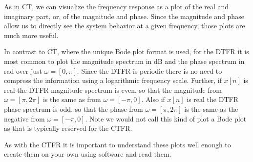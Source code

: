 As in CT, we can visualize the frequency response as a plot of the real and imaginary part, or, of the magnitude and phase. Since the magnitude and phase allow us to directly see the system behavior at a given frequency, those plots are much more useful.

In contrast to CT, where the unique Bode plot format is used, for the DTFR it is most common to plot the magnitude spectrum in dB and the phase spectrum in rad over just $\omega = [0, \pi]$. Since the DTFR is periodic there is no need to compress the information using a logarithmic frequency scale. Further, if $x[n]$ is real the DTFR magnitude spectrum is even, so that the magnitude from $\omega = [\pi, 2\pi]$ is the same as from $\omega = [-\pi, 0]$. Also if $x[n]$ is real the DTFR phase spectrum is odd, so that the phase from $\omega = [\pi, 2\pi]$ is the same as the negative from $\omega = [-\pi, 0]$. Note we would not call this kind of plot a Bode plot as that is typically reserved for the CTFR.

As with the CTFR it is important to understand these plots well enough to create them on your own using software and read them.

